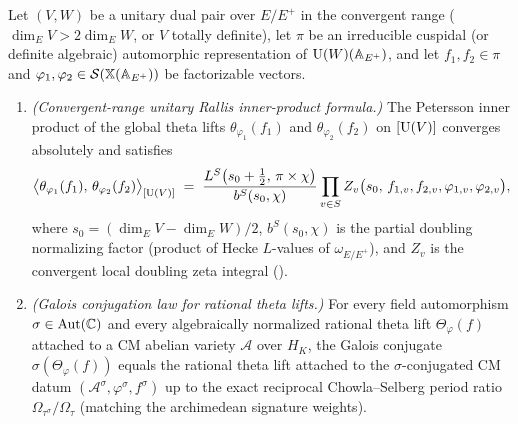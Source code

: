 \begin{proposition}
\label{prop:12:rallis-conj}
Let $(V, W)$ be a unitary dual pair over $E/E^+$ in the convergent range ($\dim_E V > 2\dim_E W$, or $V$ totally definite), let $\pi$ be an irreducible cuspidal (or definite algebraic) automorphic representation of $\mathrm{U}(W)(\mathbb{A}_{E^+})$, and let $f_1, f_2 \in \pi$ and $\varphi_1, \varphi_2 \in \mathcal{S}(\mathbb{X}(\mathbb{A}_{E^+}))$ be factorizable vectors.
\begin{enumerate}[label=\textup{(\roman*)}]
\item \emph{(Convergent-range unitary Rallis inner-product formula.)} The Petersson inner product of the global theta lifts $\theta_{\varphi_1}(f_1)$ and $\theta_{\varphi_2}(f_2)$ on $[\mathrm{U}(V)]$ converges absolutely and satisfies
  \begin{equation}
  \label{eq:12:rallis-ip}
    \bigl\langle \theta_{\varphi_1}(f_1),\, \theta_{\varphi_2}(f_2) \bigr\rangle_{[\mathrm{U}(V)]}
    \;=\; \frac{L^S\!\left(s_0 + \frac{1}{2},\, \pi \times \chi\right)}{b^S(s_0, \chi)} \prod_{v \in S} Z_v\bigl(s_0,\, f_{1,v}, f_{2,v}, \varphi_{1,v}, \varphi_{2,v}\bigr),
  \end{equation}
  where $s_0 = (\dim_E V - \dim_E W)/2$, $b^S(s_0, \chi)$ is the partial doubling normalizing factor (product of Hecke $L$-values of $\omega_{E/E^+}$), and $Z_v$ is the convergent local doubling zeta integral ().
\item \emph{(Galois conjugation law for rational theta lifts.)} For every field automorphism $\sigma \in \mathrm{Aut}(\mathbb{C})$ and every algebraically normalized rational theta lift $\Theta_{\varphi}(f)$ attached to a CM abelian variety $\mathcal{A}$ over $H_K$, the Galois conjugate $\sigma(\Theta_\varphi(f))$ equals the rational theta lift attached to the $\sigma$-conjugated CM datum $(\mathcal{A}^\sigma, \varphi^\sigma, f^\sigma)$ up to the exact reciprocal Chowla--Selberg period ratio $\Omega_{\tau^\sigma} / \Omega_\tau$ (matching the archimedean signature weights).
\end{enumerate}
\end{proposition}


